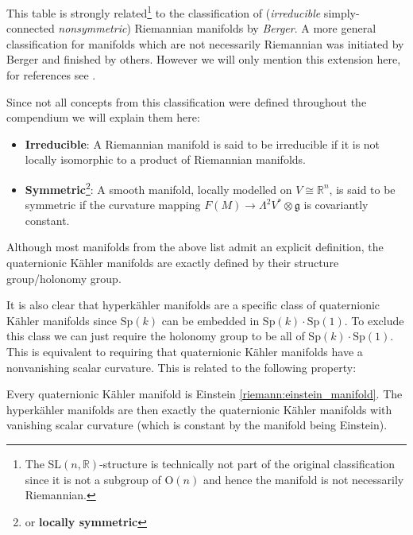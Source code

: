    \begin{remark*}
        This table is strongly related\footnote{The SL$(n, \mathbb{R})$-structure is technically not part of the original classification since it is not a subgroup of O$(n)$ and hence the manifold is not necessarily Riemannian.} to the classification of (\textit{irreducible} simply-connected \textit{nonsymmetric}) Riemannian manifolds by \textit{Berger}. A more general classification for manifolds which are not necessarily Riemannian was initiated by Berger and finished by others. However we will only mention this extension here, for references see \cite{diffgeom_physics}.

        Since not all concepts from this classification were defined throughout the compendium we will explain them here:
        \begin{itemize}
            \item \textbf{Irreducible}: A Riemannian manifold is said to be irreducible if it is not locally isomorphic to a product of Riemannian manifolds.
            \item \textbf{Symmetric}\footnote{or \textbf{locally symmetric}}: A smooth manifold, locally modelled on $V\cong\mathbb{R}^n$, is said to be symmetric if the curvature mapping $F(M)\rightarrow\Lambda^2V^*\otimes\mathfrak{g}$ is covariantly constant.
        \end{itemize}
    \end{remark*}

    \begin{remark}
        Although most manifolds from the above list admit an explicit definition, the quaternionic K\"ahler manifolds are exactly defined by their structure group/holonomy group.

        It is also clear that hyperk\"ahler manifolds are a specific class of quaternionic K\"ahler manifolds since Sp$(k)$ can be embedded in Sp$(k)\cdot\text{Sp}(1)$. To exclude this class we can just require the holonomy group to be all of Sp$(k)\cdot\text{Sp}(1)$. This is equivalent to requiring that quaternionic K\"ahler manifolds have a nonvanishing scalar curvature. This is related to the following property:
    \end{remark}
    \begin{property}
        Every quaternionic K\"ahler manifold is Einstein \ref{riemann:einstein_manifold}. The hyperk\"ahler manifolds are then exactly the quaternionic K\"ahler manifolds with vanishing scalar curvature (which is constant by the manifold being Einstein).
    \end{property}